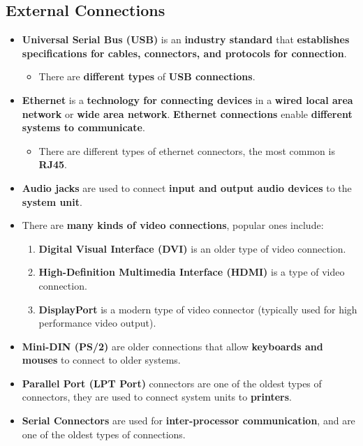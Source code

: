 \documentclass{article}
\begin{document}
    \subsection*{External Connections}
    \begin{itemize}
        \item \textbf{Universal Serial Bus (USB)} is an \textbf{industry standard} that \textbf{establishes specifications for cables, connectors, and protocols for connection}.
        \begin{itemize}
            \item There are \textbf{different types} of \textbf{USB connections}.
        \end{itemize}
        \item \textbf{Ethernet} is a \textbf{technology for connecting devices} in a \textbf{wired local area network} or \textbf{wide area network}. \textbf{Ethernet connections} enable \textbf{different systems to communicate}.
        \begin{itemize}
            \item There are different types of ethernet connectors, the most common is \textbf{RJ45}.
        \end{itemize}
        \item \textbf{Audio jacks} are used to connect \textbf{input and output audio devices} to the \textbf{system unit}.
        \item There are \textbf{many kinds of video connections}, popular ones include:
        \begin{enumerate}
            \item \textbf{Digital Visual Interface (DVI)} is an older type of video connection.
            \item \textbf{High-Definition Multimedia Interface (HDMI)} is a type of video connection.
            \item \textbf{DisplayPort} is a modern type of video connector (typically used for high performance video output).
        \end{enumerate}
        \item \textbf{Mini-DIN (PS/2)} are older connections that allow \textbf{keyboards and mouses} to connect to older systems.
        \item \textbf{Parallel Port (LPT Port)} connectors are one of the oldest types of connectors, they are used to connect system units to \textbf{printers}.
        \item \textbf{Serial Connectors} are used for \textbf{inter-processor communication}, and are one of the oldest types of connections.

\end{itemize}
\end{document}
